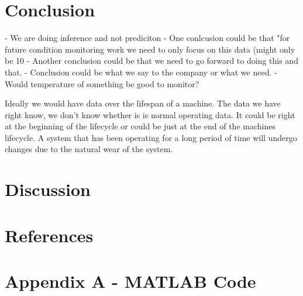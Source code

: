 \documentclass{article}
\begin{document}
\newpage  
\section{Conclusion}
- We are doing inference and not prediciton
- One conlcusion could be that "for future condition monitoring work we need to only focus on this data (might only be 10%
- Another conclusion could be that we need to go forward to doing this and that.
- Conclusion could be what we say to the company or what we need.
- Would temperature of something be good to monitor?

Ideally we would have data over the lifespan of a machine. The data we have right know, we don't know whether is is normal operating data. It could be right at the beginning of the lifecycle or could be just at the end of the machines lifecycle. A system that has been operating for a long period of time will undergo changes due
to the natural wear of the system.
\newpage 
\section{Discussion} 

\newpage  
\section{References} 

 

\newpage  
\section{Appendix A - MATLAB Code}
\end{document}
